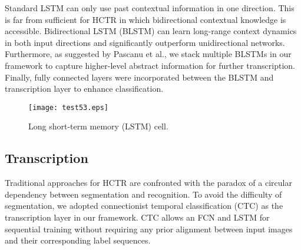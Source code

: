\documentclass[10pt,conference,a4paper]{IEEEtran}
\begin{document}
Standard LSTM can only use past contextual information in one direction. This is far from sufficient for HCTR in which bidirectional contextual knowledge is accessible.
Bidirectional LSTM (BLSTM) can learn long-range context dynamics in both input directions and significantly outperform unidirectional networks.
Furthermore, as suggested by Pascanu et al.\cite{pascanu2013construct}, we stack multiple BLSTMs in our framework to capture higher-level abstract information for further transcription. 
Finally, fully connected layers were incorporated between the BLSTM and transcription layer to enhance classification.



\begin{figure}[t]
\centering
\texttt{[image: test53.eps]}
\caption{Long short-term memory (LSTM) cell.}
\label{LSTM}
\end{figure}

%
%


\subsection{Transcription}
Traditional approaches for HCTR are confronted with the paradox of a circular dependency between segmentation and recognition.
To avoid the difficulty of segmentation, we adopted connectionist temporal classification (CTC) as the transcription layer in our framework. CTC allows an FCN and LSTM for sequential training without requiring any prior alignment between input images and their corresponding label sequences.
\end{document}
